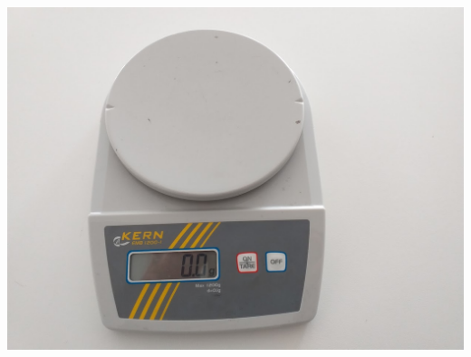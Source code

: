 \documentclass[12pt,a4paper,oneside]{book}
\newcounter{testexample} %
\theoremstyle{esercizio}
\begin{document}
\begin{testexample}
	
\begin{minipage}{\linewidth}
	\centering
	\includegraphics[scale=0.14]{img/bilancia}
	\label{fig:bilancia}
\end{minipage}
	
	
\end{testexample}
\end{document}
